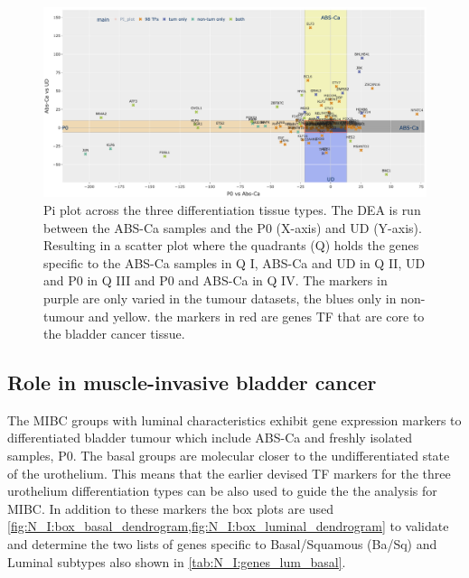 \begin{figure}
    \includegraphics[width=1.0\textwidth,height=1.0\textheight,keepaspectratio]{Sections/Network_I/Resources/selective_pruning/sel_tfs/sel_tfs_pi_all_var_rect.png}
    \caption[The 98 TF and the DEA across the healthy datasets]{Pi plot across the three differentiation tissue types. The DEA is run between the ABS-Ca samples and the P0 (X-axis) and UD (Y-axis). Resulting in a scatter plot where the quadrants (Q) holds the genes specific to the ABS-Ca samples in Q I, ABS-Ca and UD in Q II, UD and P0 in Q III and P0 and ABS-Ca in Q IV. The markers in purple are only varied in the tumour datasets, the blues only in non-tumour and yellow. the markers in red are genes TF that are core to the bladder cancer tissue. }
    \label{fig:N_I:pi_sel_tfs_var}
\end{figure}

\newpage


\subsection{Role in muscle-invasive bladder cancer} \label{s:N_I:sel_tfs_cancer}


The MIBC groups with luminal characteristics exhibit gene expression markers to differentiated bladder tumour which include ABS-Ca and freshly isolated samples, P0. The basal groups are molecular closer to the undifferentiated state of the urothelium. This means that the earlier devised TF markers for the three urothelium differentiation types can be also used to guide the the analysis for MIBC. In addition to these markers the box plots are used \cref{fig:N_I:box_basal_dendrogram,fig:N_I:box_luminal_dendrogram} to validate and determine the two lists of genes specific to Basal/Squamous (Ba/Sq) and Luminal subtypes  also shown in \cref{tab:N_I:genes_lum_basal}. 

